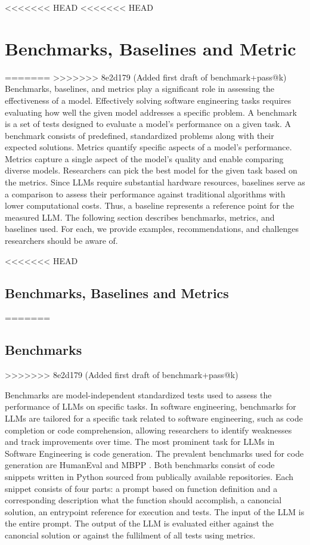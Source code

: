 \documentclass[11pt]{article}
\begin{document}
<<<<<<< HEAD
<<<<<<< HEAD

\section{Benchmarks, Baselines and Metric}
=======
>>>>>>> 8e2d179 (Added first draft of benchmark+pass@k)
Benchmarks, baselines, and metrics play a significant role in assessing the effectiveness of a model.
Effectively solving software engineering tasks requires evaluating how well the given model addresses a specific problem.
A benchmark is a set of tests designed to evaluate a model's performance on a given task.
A benchmark consists of predefined, standardized problems along with their expected solutions.
Metrics quantify specific aspects of a model's performance.
Metrics capture a single aspect of the model's quality and enable comparing diverse models.
Researchers can pick the best model for the given task based on the metrics.
Since LLMs require substantial hardware resources, baselines serve as a comparison to assess their performance against traditional algorithms with lower computational costs.
Thus, a baseline represents a reference point for the measured LLM.
The following section describes benchmarks, metrics, and baselines used.
For each, we provide examples, recommendations, and challenges researchers should be aware of.

<<<<<<< HEAD
\subsection{Benchmarks, Baselines and Metrics}
=======
\subsection{Benchmarks}
>>>>>>> 8e2d179 (Added first draft of benchmark+pass@k)

Benchmarks are model-independent standardized tests used to assess the performance of LLMs on specific tasks.
In software engineering, benchmarks for LLMs are tailored for a specific task related to software engineering, such as code completion or code comprehension, allowing researchers to identify weaknesses and track improvements over time.
The most prominent task for LLMs in Software Engineering is code generation.
The prevalent benchmarks used for code generation are HumanEval \cite{TODO} and MBPP \cite{MBPP}.
Both benchmarks consist of code snippets written in Python sourced from publically available repositories.
Each snippet consists of four parts: a prompt based on function definition and a corresponding description what the function should accomplish, a canoncial solution, an entrypoint reference for execution and tests.
The input of the LLM is the entire prompt.
The output of the LLM is evaluated either against the canoncial solution or against the fullilment of all tests using metrics.
\end{document}
